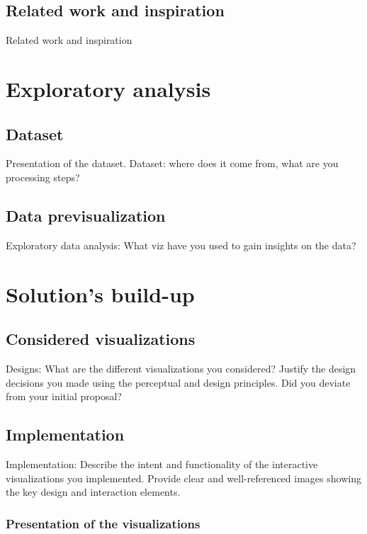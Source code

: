 \documentclass[a4paper,10pt]{article}
\begin{document}
\subsection{Related work and inspiration}

Related work and inspiration

\section{Exploratory analysis}

\subsection{Dataset}

Presentation of the dataset.
Dataset: where does it come from, what are you processing steps?

\subsection{Data previsualization}

Exploratory data analysis: What viz have you used to gain insights on the data?

\section{Solution's build-up}

\subsection{Considered visualizations}

Designs: What are the different visualizations you considered? Justify the design decisions you made using the perceptual and design principles.
Did you deviate from your initial proposal?

\subsection{Implementation}

Implementation: Describe the intent and functionality of the interactive visualizations you implemented. Provide clear and well-referenced images showing the key design and interaction elements.

\subsubsection{Presentation of the visualizations}
\end{document}
